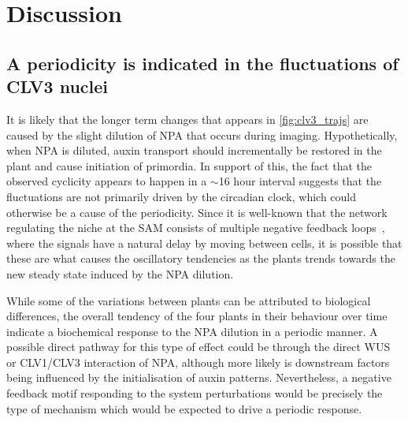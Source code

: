 \chapter{Discussion}

\ifpdf
\graphicspath{{Chapter4/Figs/Raster/}{Chapter4/Figs/PDF/}{Chapter4/Figs/}}
\else
\graphicspath{{Chapter4/Figs/Vector/}{Chapter4/Figs/}}
\fi

\section{A periodicity is indicated in the fluctuations of CLV3 nuclei}
It is likely that the longer term changes that appears in \cref{fig:clv3_trajs} are
caused by the slight dilution of NPA that occurs during imaging. Hypothetically,
when NPA is diluted, auxin transport should incrementally be restored in the plant
and cause initiation of primordia. In support of this, the fact that the
observed cyclicity appears to  
happen in a $\sim$16 hour interval suggests that the fluctuations are not
primarily driven by the circadian clock, which could otherwise be a cause of the
periodicity. Since it is well-known that the network regulating
the niche at the SAM consists of multiple negative feedback
loops~\cite{gordon2009multiple}, where
the signals have a natural delay by moving between cells, it is
possible that these are what causes the oscillatory tendencies as the
plants trends towards the new steady state induced by the NPA dilution.

While some of the variations between plants can be attributed to biological
differences, the overall tendency of the four plants in their behaviour over
time indicate a biochemical response to the NPA dilution in a periodic manner. A
possible direct pathway for this type of effect could be through the direct WUS
or CLV1/CLV3 interaction of NPA, although more likely is downstream factors
being influenced by the initialisation of auxin patterns. Nevertheless, a
negative feedback motif responding to the system perturbations would be precisely the
type of mechanism which would be expected to drive a periodic response.

